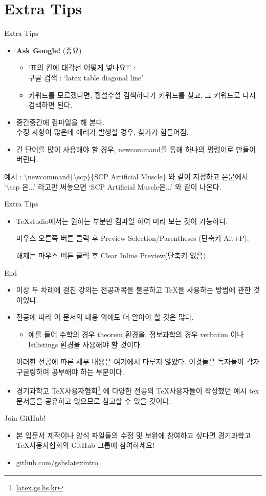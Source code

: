 \documentclass[12pt]{beamer}
\begin{document}
\section{Extra Tips}
\begin{frame}{Extra Tips}
	\begin{itemize}
		\item \textbf{Ask Google!} (중요)
		\begin{itemize}
			\item `표의 칸에 대각선 어떻게 넣나요?' : \\
			구글 검색 : `latex table diagonal line'
			\item 키워드를 모르겠다면, 횡설수설 검색하다가 키워드를 찾고, 그 키워드로 다시 검색하면 된다.
		\end{itemize}
		\item 중간중간에 컴파일을 해 본다. \\
		수정 사항이 많은데 에러가 발생할 경우, 찾기가 힘들어짐.
		\item 긴 단어를 많이 사용해야 할 경우, newcommand를 통해 하나의 명령어로 만들어 버린다.
	\end{itemize}
	\begin{footnotesize}
		예시 : \textbackslash newcommand\{\textbackslash scp\}\{SCP Artificial Muscle\} 와 같이 지정하고 본문에서 `\textbackslash scp 은...' 라고만 써놓으면 `SCP Artificial Muscle은...' 와 같이 나온다.
	\end{footnotesize}
\end{frame}
\begin{frame}{Extra Tips}
	\begin{itemize}
		\item TeXstudio에서는 원하는 부분만 컴파일 하여 미리 보는 것이 가능하다. 
		
		마우스 오른쪽 버튼 클릭 후 Preview Selection/Parentheses (단축키 Alt+P).
		
		해제는 마우스 버튼 클릭 후 Clear Inline Preview(단축키 없음).
	\end{itemize}
\end{frame}
\begin{frame}{End}
	\begin{itemize}
		\item 이상 두 차례에 걸친 강의는 전공과목을 불문하고 \TeX 을 사용하는 방법에 관한 것이었다.
		\item 전공에 따라 이 문서의 내용 외에도 더 알아야 할 것은 많다. 
		\begin{itemize}
			\item 예를 들어 수학의 경우 theorem 환경을, 정보과학의 경우 verbatim 이나 lstlistings 환경을 사용해야 할 것이다.
		\end{itemize}
		이러한 전공에 따른 세부 내용은 여기에서 다루지 않았다. 이것들은 독자들이 각자 구글링하여 공부해야 하는 부분이다.
		\item 경기과학고 \TeX 사용자협회\footnote{\url{latex.gs.hs.kr}}  에 다양한 전공의 \TeX 사용자들이 작성했던 예시 tex 문서들을 공유하고 있으므로 참고할 수 있을 것이다.
	\end{itemize}
\end{frame}
\begin{frame}{Join GitHub!}
	\begin{itemize}
		\item 본 입문서 제작이나 양식 파일들의 수정 및 보완에 참여하고 싶다면 경기과학고 \TeX 사용자협회의 GitHub 그룹에 참여하세요!
		\item \url{github.com/gshslatexintro}
	\end{itemize}
\end{frame}
\end{document}
